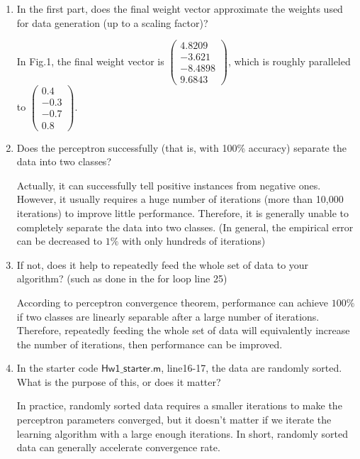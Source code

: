 \documentclass[12pt]{article}
\begin{document}
\begin{enumerate}
	\item In the first part, does the final weight vector approximate the weights used for data generation (up to a scaling factor)?
	\begin{flushleft}
		In Fig.1, the final weight vector is $\begin{pmatrix}4.8209 \\ -3.621\\-8.4898 \\ 9.6843\end{pmatrix}$, which is roughly 
		paralleled to $\begin{pmatrix}0.4 \\ -0.3 \\ -0.7 \\ 0.8\end{pmatrix}$.
	\end{flushleft}
	\item Does the perceptron successfully (that is, with 100\% accuracy) separate the data into two classes?
	\begin{flushleft}
		Actually, it can successfully tell positive instances from negative ones. However, it usually requires a huge number of iterations 
		(more than 10,000 iterations) to improve little performance. Therefore, it is generally unable to completely separate the data into two 
		classes. (In general, the empirical error can be decreased to $1\%$ with only 
		hundreds of iterations)
	\end{flushleft}
	\item If not, does it help to repeatedly feed the whole set of data to your algorithm? (such as done in the for loop line 25)
	\begin{flushleft}
		According to perceptron convergence theorem, performance can achieve $100\%$ if two classes are linearly separable after a large number of 
		iterations. Therefore, repeatedly feeding the whole set of data will equivalently increase the number of iterations, then performance can be 
		improved.
	\end{flushleft}
	\item In the starter code $\mathsf{Hw1\_starter.m}$, line16-17, the data are randomly sorted. What is the purpose of this, or does it matter?
	\begin{flushleft}
		In practice, randomly sorted data requires a smaller iterations to make the perceptron parameters converged, but it doesn't matter if we 
		iterate the learning algorithm with a large enough iterations. In short, randomly sorted data can generally accelerate convergence rate.

\end{flushleft}
\end{enumerate}
\end{document}
